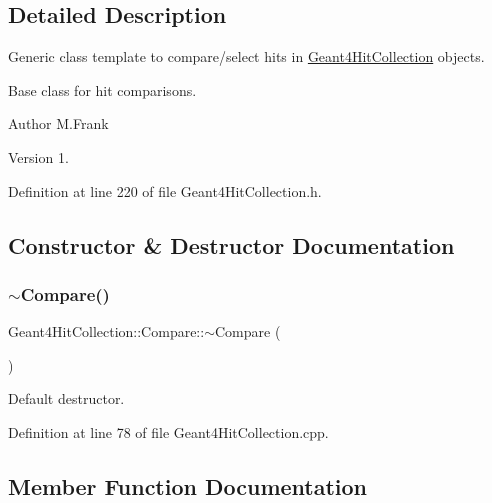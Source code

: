 \subsection{Detailed Description}
Generic class template to compare/select hits in \hyperlink{class_d_d4hep_1_1_simulation_1_1_geant4_hit_collection}{Geant4\+Hit\+Collection} objects. 

Base class for hit comparisons.

\begin{DoxyAuthor}{Author}
M.\+Frank 
\end{DoxyAuthor}
\begin{DoxyVersion}{Version}
1. 
\end{DoxyVersion}


Definition at line 220 of file Geant4\+Hit\+Collection.\+h.



\subsection{Constructor \& Destructor Documentation}
\hypertarget{class_d_d4hep_1_1_simulation_1_1_geant4_hit_collection_1_1_compare_a564c52106afdec9d7721a4089ada4fb9}{}\label{class_d_d4hep_1_1_simulation_1_1_geant4_hit_collection_1_1_compare_a564c52106afdec9d7721a4089ada4fb9} 
\subsubsection{\texorpdfstring{$\sim$\+Compare()}{~Compare()}}
{\footnotesize\ttfamily Geant4\+Hit\+Collection\+::\+Compare\+::$\sim$\+Compare (\begin{DoxyParamCaption}{ }\end{DoxyParamCaption})\hspace{0.3cm}{\ttfamily [virtual]}}



Default destructor. 



Definition at line 78 of file Geant4\+Hit\+Collection.\+cpp.



\subsection{Member Function Documentation}
\hypertarget{class_d_d4hep_1_1_simulation_1_1_geant4_hit_collection_1_1_compare_ad81521e6dfc48aaee6d2dd9464a7afeb}{}\label{class_d_d4hep_1_1_simulation_1_1_geant4_hit_collection_1_1_compare_ad81521e6dfc48aaee6d2dd9464a7afeb} 
